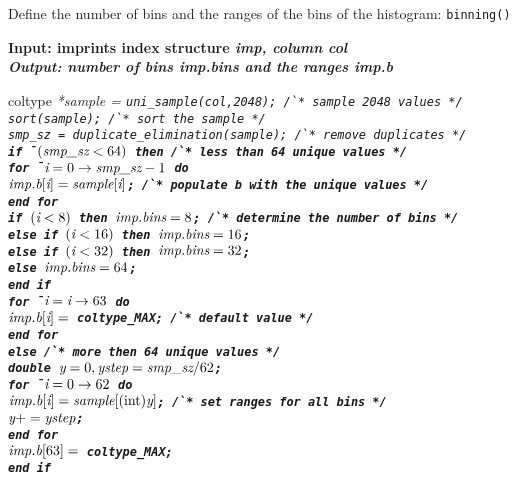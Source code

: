 \begin{algorithm}[t]
\caption{Define the number of bins and the ranges of the bins of the
histogram: \tt{binning()}}
\label{alg:binning}
\small{
\bf{Input:}  imprints index structure \it{imp}, column \it{col}\\
\bf{Output:} number of bins \it{imp.bins} and the ranges \it{imp.b}
\begin{tabbing}
coltype \it{*sample} = \tt{uni\_sample}(\it{col},2048);
\` /* sample 2048 values */\\
\tt{sort}(\it{sample});
\` /* sort the sample */\\
\it{smp\_sz} = \tt{duplicate\_elimination}(\it{sample});
\` /* remove duplicates */\\
\bf{if}\=\ $(\it{smp\_sz} < 64)$ \bf{then}
\` /* less than 64 unique values */\\
\>\bf{for}\=\ $\it{i}=0\rightarrow \it{smp\_sz}-1$ \bf{do}\\
\>\>$\it{imp.b}[\it{i}]=\it{sample}[\it{i}]$;
\` /* populate \it{b} with the unique values */\\
\>\bf{end for}\\
\>\bf{if} $(\it{i}<8)$ \bf{then} $\it{imp.bins}=8$;
\` /* determine the number of \it{bins} */\\
\>\bf{else if} $(\it{i}<16)$ \bf{then} $\it{imp.bins}=16$;\\
\>\bf{else if} $(\it{i}<32)$ \bf{then} $\it{imp.bins}=32$;\\
\>\bf{else} $\it{imp.bins}=64$;\\
\>\bf{end if}\\
\>\bf{for}\=\ $\it{i}=\it{i}\rightarrow 63$ \bf{do}\\
\>\>$\it{imp.b}[\it{i}]= $ coltype\_MAX;
\` /* default value */\\
\>\bf{end for}\\
\bf{else}
\` /* more then 64 unique values */\\
\> double $\it{y} = 0, \it{ystep} = \it{smp\_sz}/62$;\\
\>\bf{for}\=\ $\it{i}=0\rightarrow 62$ \bf{do}\\
\>\>$\it{imp.b}[\it{i}]=\it{sample}[(\text{int})\it{y}]$;
\` /* set ranges for all bins */\\
\>\>$\it{y}+=\it{ystep}$;\\
\>\bf{end for}\\
\>$\it{imp.b}[63]=$ coltype\_MAX;\\
\bf{end if}
\end{tabbing}
}%
\vspace{-10pt}
\end{algorithm}

